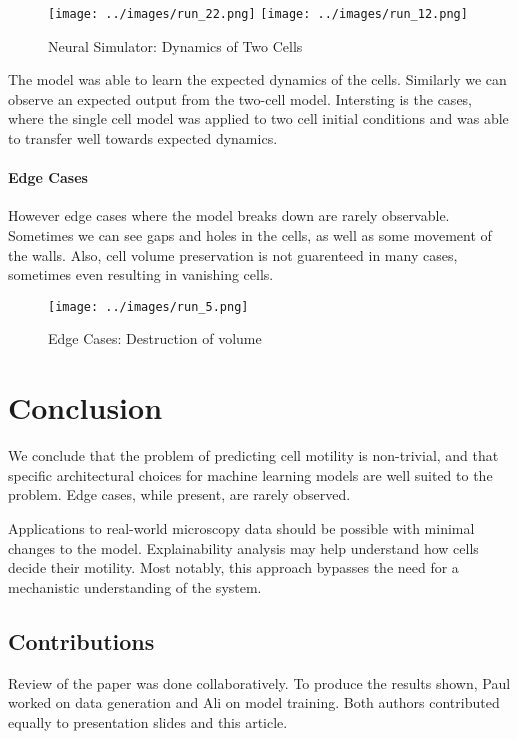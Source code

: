 \documentclass[a4paper,10pt,twocolumn]{article}
\begin{document}
            \begin{figure}[H]\centering
                \texttt{[image: ../images/run\_22.png]}
                \texttt{[image: ../images/run\_12.png]}
                \caption{Neural Simulator: Dynamics of Two Cells}
            \end{figure}
            The model was able to learn the expected dynamics of the cells.
            Similarly we can observe an expected output from the two-cell model.
            Intersting is the cases, where the single cell model was applied to two cell initial conditions
            and was able to transfer well towards expected dynamics.
            
            \paragraph{Edge Cases}
            However edge cases where the model breaks down are rarely observable.
            Sometimes we can see gaps and holes in the cells, as well as some movement of the walls.
            Also, cell volume preservation is not guarenteed in many cases, sometimes even resulting in vanishing cells.
            \begin{figure}[H]\centering
                \texttt{[image: ../images/run\_5.png]}
                \caption{Edge Cases: Destruction of volume}
            \end{figure}

    \section{Conclusion}
        We conclude that the problem of predicting cell motility is non-trivial, and that
        specific architectural choices for machine learning models are well suited to the problem.
        Edge cases, while present, are rarely observed.

        Applications to real-world microscopy data should be possible with minimal changes to the model.
        Explainability analysis may help understand how cells decide their motility.
        Most notably, this approach bypasses the need for a mechanistic understanding of the system.

        \subsection*{Contributions}
            Review of the paper was done collaboratively. 
            To produce the results shown, Paul worked on data generation and Ali on model training.
            Both authors contributed equally to presentation slides and this article.

    
    
    
\end{document}
